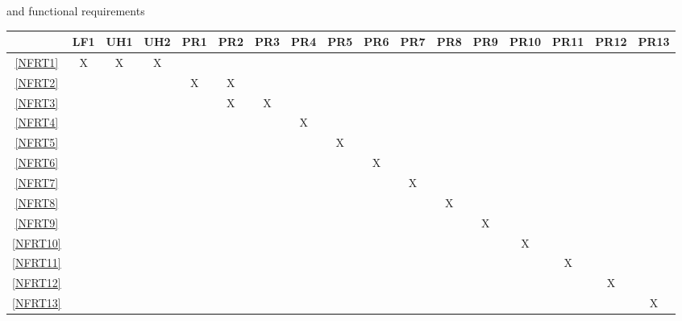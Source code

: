 \documentclass[12pt, titlepage]{article}
\begin{document}
\begin{landscape}
\begin{table}[h!]
{      and functional requirements}
    \label{tab:frt}
  \end{table}
  \begin{table}[h!]
    \centering
    \begin{tabular}{|c|c|c|c|c|c|c|c|c|c|c|c|c|c|c|c|c|} \hline
                & LF1 & UH1 & UH2 & PR1 & PR2 & PR3 & PR4 & PR5 & PR6 & PR7 & PR8 & PR9 & PR10 & PR11 & PR12 & PR13 \\ \hline
      \ref{NFRT1}  & X   & X   & X   &     &     &     &     &     &     &     &     &     &      &      &      &      \\ \hline
      \ref{NFRT2}  &     &     &     & X   & X   &     &     &     &     &     &     &     &      &      &      &      \\ \hline
      \ref{NFRT3}  &     &     &     &     & X   & X   &     &     &     &     &     &     &      &      &      &      \\ \hline
      \ref{NFRT4}  &     &     &     &     &     &     & X   &     &     &     &     &     &      &      &      &      \\ \hline
      \ref{NFRT5}  &     &     &     &     &     &     &     & X   &     &     &     &     &      &      &      &      \\ \hline
      \ref{NFRT6}  &     &     &     &     &     &     &     &     & X   &     &     &     &      &      &      &      \\ \hline
      \ref{NFRT7}  &     &     &     &     &     &     &     &     &     & X   &     &     &      &      &      &      \\ \hline
      \ref{NFRT8}  &     &     &     &     &     &     &     &     &     &     & X   &     &      &      &      &      \\ \hline
      \ref{NFRT9}  &     &     &     &     &     &     &     &     &     &     &     & X   &      &      &      &      \\ \hline
      \ref{NFRT10} &     &     &     &     &     &     &     &     &     &     &     &     & X    &      &      &      \\ \hline
      \ref{NFRT11} &     &     &     &     &     &     &     &     &     &     &     &     &      & X    &      &      \\ \hline
      \ref{NFRT12} &     &     &     &     &     &     &     &     &     &     &     &     &      &      & X    &      \\ \hline
      \ref{NFRT13} &     &     &     &     &     &     &     &     &     &     &     &     &      &      &      & X    \\ \hline

\end{tabular}
\end{table}
\end{landscape}
\end{document}
